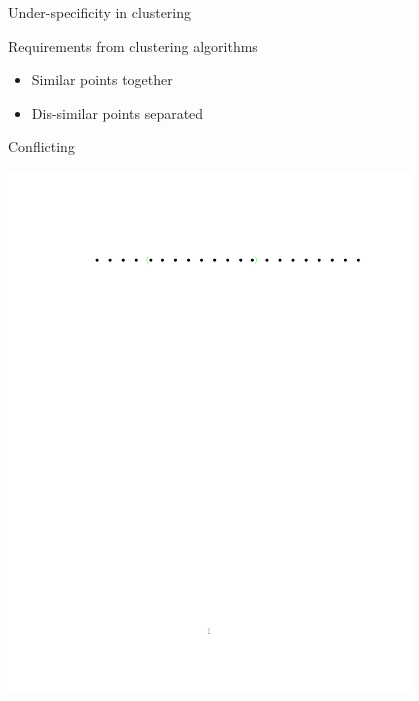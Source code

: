 \documentclass{beamer}
\begin{document}
\begin{frame}{Under-specificity in clustering}
	
	Requirements from clustering algorithms\\
	\vspace{10pt}
	\begin{block}{}
		\begin{itemize}
			\item Similar points together
			\item Dis-similar points separated
		\end{itemize}
	\end{block}
	
	\vspace{10pt}\alert{Conflicting}
	\begin{center}
	\includegraphics[trim={100 650 30 120},clip,width=0.8\textwidth]{figures/conflictingReq.pdf}
	\end{center}
\end{frame}
\end{document}
